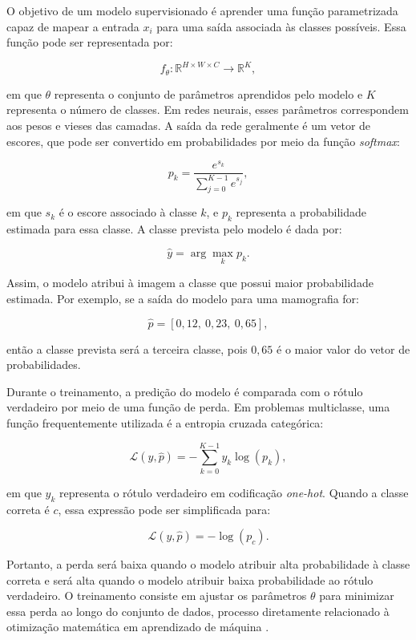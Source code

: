 \documentclass[
    12pt,
    openright,
    oneside,
    a4paper,
    english,
    brazil
]{abntex2}
\begin{document}
O objetivo de um modelo supervisionado é aprender uma função parametrizada capaz de mapear a entrada \(x_i\) para uma saída associada às classes possíveis. Essa função pode ser representada por:

\[
f_{\theta}: \mathbb{R}^{H \times W \times C} \rightarrow \mathbb{R}^{K},
\]

em que \(\theta\) representa o conjunto de parâmetros aprendidos pelo modelo e \(K\) representa o número de classes. Em redes neurais, esses parâmetros correspondem aos pesos e vieses das camadas. A saída da rede geralmente é um vetor de escores, que pode ser convertido em probabilidades por meio da função \textit{softmax}:

\[
p_k =
\frac{e^{s_k}}
{\sum_{j=0}^{K-1} e^{s_j}},
\]

em que \(s_k\) é o escore associado à classe \(k\), e \(p_k\) representa a probabilidade estimada para essa classe. A classe prevista pelo modelo é dada por:

\[
\hat{y} =
\arg\max_k p_k.
\]

Assim, o modelo atribui à imagem a classe que possui maior probabilidade estimada. Por exemplo, se a saída do modelo para uma mamografia for:

\[
\hat{p} = [0{,}12,\ 0{,}23,\ 0{,}65],
\]

então a classe prevista será a terceira classe, pois \(0{,}65\) é o maior valor do vetor de probabilidades.

Durante o treinamento, a predição do modelo é comparada com o rótulo verdadeiro por meio de uma função de perda. Em problemas multiclasse, uma função frequentemente utilizada é a entropia cruzada categórica:

\[
\mathcal{L}(y,\hat{p}) =
-\sum_{k=0}^{K-1}
y_k \log(p_k),
\]

em que \(y_k\) representa o rótulo verdadeiro em codificação \textit{one-hot}. Quando a classe correta é \(c\), essa expressão pode ser simplificada para:

\[
\mathcal{L}(y,\hat{p}) =
-\log(p_c).
\]

Portanto, a perda será baixa quando o modelo atribuir alta probabilidade à classe correta e será alta quando o modelo atribuir baixa probabilidade ao rótulo verdadeiro. O treinamento consiste em ajustar os parâmetros \(\theta\) para minimizar essa perda ao longo do conjunto de dados, processo diretamente relacionado à otimização matemática em aprendizado de máquina \cite{deisenroth2020mathematics,goodfellow2016deep}.
\end{document}
